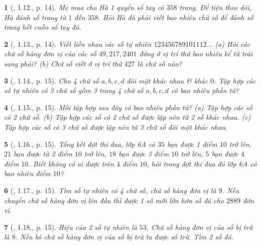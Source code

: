 \documentclass{article}
\newtheorem{baitoan}{}
\begin{document}
\begin{baitoan}[\cite{Binh_boi_duong_Toan_6_tap_1}, 1.12., p. 14]
	Mẹ mua cho Hà 1 quyển sổ tay có $358$ trang. Để tiện theo dõi, Hà đánh số trang từ $1$ đến $358$. Hỏi Hà đã phải viết bao nhiêu chữ số để đánh số trang hết cuốn sổ tay đó.
\end{baitoan}

\begin{baitoan}[\cite{Binh_boi_duong_Toan_6_tap_1}, 1.13., p. 14]
	Viết liền nhau các số tự nhiên $123456789101112\ldots$ (a) Hỏi các chữ số hàng đơn vị của các số $49,217,2401$ đứng ở vị trí thứ bao nhiêu kể từ trái sang phải? (b) Chữ số viết ở vị trí thứ $427$ là chữ số nào?
\end{baitoan}

\begin{baitoan}[\cite{Binh_boi_duong_Toan_6_tap_1}, 1.14., p. 15]
	Cho 4 chữ số $a,b,c,d$ đôi một khác nhau \& khác $0$. Tập hợp các số tự nhiên có 3 chữ số gồm 3 trong 4 chữ số $a,b,c,d$ có bao nhiêu phần tử?
\end{baitoan}

\begin{baitoan}[\cite{Binh_boi_duong_Toan_6_tap_1}, 1.15., p. 15]
	Mỗi tập hợp sau đây có bao nhiêu phần tử? (a) Tập hợp các số có 2 chữ số. (b) Tập hợp các số có 2 chữ số được lập nên từ 2 số khác nhau. (c) Tập hợp các số có 3 chữ số được lập nên từ 3 chữ số đôi một khác nhau.
\end{baitoan}

\begin{baitoan}[\cite{Binh_boi_duong_Toan_6_tap_1}, 1.16., p. 15]
	Tổng kết đợt thi đua, lớp 6A có $35$ bạn được 1 điểm $10$ trở lên, $21$ bạn được từ 2 điểm $10$ trở lên, $18$ bạn được 3 điểm $10$ trở lên, $5$ bạn được $4$ điểm $10$. Biết không có ai được trên $4$ điểm $10$, hỏi trong đợt thi đua đó lớp 6A có bao nhiêu điểm $10$?
\end{baitoan}

\begin{baitoan}[\cite{Binh_boi_duong_Toan_6_tap_1}, 1.17., p. 15]
	Tìm số tự nhiên có 4 chữ số, chữ số hàng đơn vị là $9$. Nếu chuyển chữ số hàng đơn vị lên đầu thì được 1 số mới lớn hơn số đã cho $2889$ đơn vị.
\end{baitoan}

\begin{baitoan}[\cite{Binh_boi_duong_Toan_6_tap_1}, 1.18., p. 15]
	Hiệu của 2 số tự nhiên là $53$. Chữ số hàng đơn vị của số bị trừ là $8$. Nếu bỏ chữ số hàng đơn vị của số bị trừ ta được số trừ. Tìm 2 số đó.
\end{baitoan}
\end{document}
